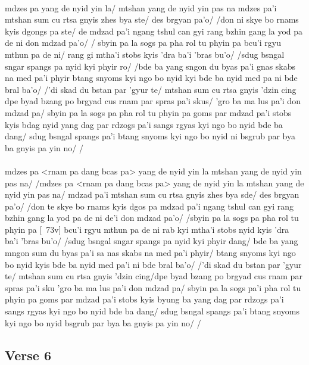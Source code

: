 \documentclass[12pt]{article}
\begin{document}
\textbf{\TVA}\\
mdzes pa yang de nyid yin la/ mtshan yang de nyid yin pas na mdzes pa'i mtshan sum cu rtsa gnyis zhes bya ste/ des brgyan pa'o/ /don ni skye bo rnams kyis dgongs pa ste/ de mdzad pa'i ngang tshul can gyi rang bzhin gang la yod pa de ni don mdzad pa'o/ / sbyin pa la sogs pa pha rol tu phyin pa bcu'i rgyu mthun pa de ni/ rang gi mtha'i stobs kyis 'dra ba'i 'bras bu'o/ /sdug bsngal sngar spangs pa nyid kyi phyir ro/ /bde ba yang sngon du byas pa'i gnas skabs na med pa'i phyir btang snyoms kyi ngo bo nyid kyi bde ba nyid med pa ni bde bral ba'o/ /'di skad du bstan par 'gyur te/ mtshan sum cu rtsa gnyis 'dzin cing dpe byad bzang po brgyad cus rnam par spras pa'i skus/ 'gro ba ma lus pa'i don mdzad pa/ sbyin pa la sogs pa pha rol tu phyin pa goms par mdzad pa'i stobs kyis bdag nyid yang dag par rdzogs pa'i sangs rgyas kyi ngo bo nyid bde ba dang/ sdug bsngal spangs pa'i btang snyoms kyi ngo bo nyid ni bsgrub par bya ba gnyis pa yin no/ /\\

\textbf{\TVB}\\
mdzes pa <rnam pa dang bcas pa> yang de nyid yin la mtshan yang de nyid yin pas na/ /mdzes pa <rnam pa dang bcas pa> yang de nyid yin la mtshan yang de nyid yin pas na/ mdzad pa'i mtshan sum cu rtsa gnyis zhes bya sde/ des brgyan pa'o/ /don te skye bo rnams kyis dgos pa mdzad pa'i ngang tshul can gyi rang bzhin gang la yod pa de ni de'i don mdzad pa'o/ /sbyin pa la sogs pa pha rol tu phyin pa [\TVB\ 73v] bcu'i rgyu mthun pa de ni rab kyi mtha'i stobs nyid kyis 'dra ba'i 'bras bu'o/ /sdug bsngal sngar spangs pa nyid kyi phyir dang/ bde ba yang mngon sum du byas pa'i sa nas skabs na med pa'i phyir/ btang snyoms kyi ngo bo nyid kyis bde ba nyid med pa'i ni bde bral ba'o/ /'di skad du bstan par 'gyur te/ mtshan sum cu rtsa gnyis 'dzin cing/dpe byad bzang po brgyad cus rnam par spras pa'i sku 'gro ba ma lus pa'i don mdzad pa/ sbyin pa la sogs pa'i pha rol tu phyin pa goms par mdzad pa'i stobs kyis byung ba yang dag par rdzogs pa'i sangs rgyas kyi ngo bo nyid bde ba dang/ sdug bsngal spangs pa'i btang snyoms kyi ngo bo nyid bsgrub par bya ba gnyis pa yin no/ /

\subsection{Verse 6}
\end{document}

